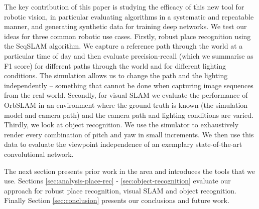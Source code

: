 The key contribution of this paper is studying the efficacy of this new tool for robotic vision, in particular evaluating algorithms in a systematic and repeatable manner, and generating synthetic data for training deep networks.
We test our ideas for three common robotic use cases.
Firstly, robust place recognition using the SeqSLAM\cite{Milford2012} algorithm.  We capture a reference path through the world at a particular time of day and then evaluate precision-recall (which we summarise as F1 score) for different paths through the world and for different lighting conditions.  The simulation allows us to change the path and the lighting independently -- something that cannot be done when capturing image sequences from the real world.
Secondly, for visual SLAM we evaluate the performance of OrbSLAM in an environment where the ground truth is known (the simulation model and camera path) and the camera path and lighting conditions are varied.
Thirdly, we look at object recognition.  We use the simulator to exhaustively render every combination of pitch and yaw in small increments. We then use this data to evaluate the viewpoint independence of an exemplary state-of-the-art convolutional network.

The next section presents prior work in the area and introduces the tools that we use.  Sections \ref{sec:analysis-place-rec} - \ref{sec:object-recognition} evaluate our approach for robust place recognition,
visual SLAM and object recognition.  Finally Section \ref{sec:conclusion} presents our conclusions and future work. 

